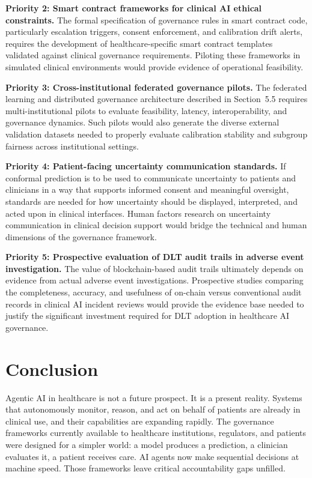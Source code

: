 \documentclass[11pt]{article}
\begin{document}
\textbf{Priority 2: Smart contract frameworks for clinical AI ethical
constraints.} The formal specification of governance rules in smart
contract code, particularly escalation triggers, consent enforcement,
and calibration drift alerts, requires the development of
healthcare-specific smart contract templates validated against clinical
governance requirements. Piloting these frameworks in simulated clinical
environments would provide evidence of operational feasibility.

\textbf{Priority 3: Cross-institutional federated governance pilots.}
The federated learning and distributed governance architecture described
in Section~5.5 requires multi-institutional pilots to evaluate
feasibility, latency, interoperability, and governance dynamics. Such
pilots would also generate the diverse external validation datasets
needed to properly evaluate calibration stability and subgroup fairness
across institutional settings.

\textbf{Priority 4: Patient-facing uncertainty communication standards.}
If conformal prediction is to be used to communicate uncertainty to
patients and clinicians in a way that supports informed consent and
meaningful oversight, standards are needed for how uncertainty should be
displayed, interpreted, and acted upon in clinical interfaces. Human
factors research on uncertainty communication in clinical decision
support would bridge the technical and human dimensions of the
governance framework.

\textbf{Priority 5: Prospective evaluation of DLT audit trails in
adverse event investigation.} The value of blockchain-based audit trails
ultimately depends on evidence from actual adverse event investigations.
Prospective studies comparing the completeness, accuracy, and usefulness
of on-chain versus conventional audit records in clinical AI incident
reviews would provide the evidence base needed to justify the
significant investment required for DLT adoption in healthcare AI
governance.


\section{Conclusion}\label{conclusion}

Agentic AI in healthcare is not a future prospect. It is a present
reality. Systems that autonomously monitor, reason, and act on behalf of
patients are already in clinical use, and their capabilities are
expanding rapidly. The governance frameworks currently available to
healthcare institutions, regulators, and patients were designed for a
simpler world: a model produces a prediction, a clinician evaluates it,
a patient receives care. AI agents now make sequential decisions at
machine speed. Those frameworks leave critical accountability gaps
unfilled.
\end{document}
